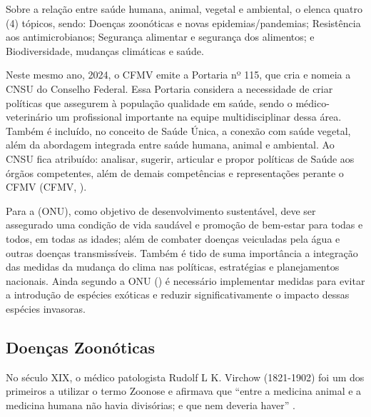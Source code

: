 \indent Sobre a relação entre saúde humana, animal, vegetal e ambiental, o  elenca quatro (4) tópicos, sendo: Doenças zoonóticas e novas epidemias/pandemias; Resistência aos antimicrobianos; Segurança alimentar e segurança dos alimentos; e Biodiversidade, mudanças climáticas e saúde.




\indent Neste mesmo ano, 2024, o \acrshort{CFMV} emite a Portaria nº 115, que cria e nomeia a \acrfull{CNSU} do Conselho Federal. Essa Portaria considera  a necessidade de criar políticas que assegurem à população qualidade em saúde, sendo o médico-veterinário um  profissional importante na equipe multidisciplinar dessa área. Também é incluído, no conceito de Saúde Única, a conexão com saúde vegetal, além da abordagem integrada entre saúde humana, animal e ambiental. Ao \acrshort{CNSU} fica atribuído: analisar, sugerir, articular e propor políticas de Saúde aos órgãos competentes, além de demais competências e representações perante o \acrshort{CFMV} (\acrlong{CFMV}, \citeyear{CFMV2024PORTARIA}).

\indent Para a  (\acrshort{ONU}), como objetivo de desenvolvimento sustentável, deve ser assegurado uma condição de vida saudável e promoção de bem-estar para todas e todos, em todas as idades; além de combater doenças veiculadas pela água e outras doenças transmissíveis. Também é tido de suma importância a integração das medidas da mudança do clima nas políticas, estratégias e planejamentos nacionais. Ainda segundo a \acrshort{ONU} (\citeyear{ONUODS22}) é necessário implementar medidas para evitar a introdução de espécies exóticas e reduzir significativamente o impacto dessas espécies invasoras.

\subsection{Doenças Zoonóticas}

\indent No século XIX, o médico patologista Rudolf L K. Virchow (1821-1902) foi um dos primeiros a utilizar o termo Zoonose e afirmava que “entre a medicina animal e a medicina humana não havia divisórias; e que nem deveria haver” \cite{CFMVSaude}.

